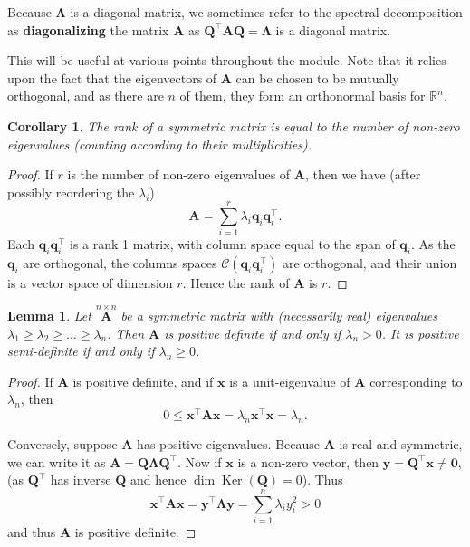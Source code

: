 \documentclass[]{book}
\newtheorem{lemma}{Lemma}[chapter]
\newtheorem{corollary}{Corollary}[chapter]
\theoremstyle{definition}
\theoremstyle{definition}
\theoremstyle{definition}
\theoremstyle{remark}
\begin{document}
Because \(\boldsymbol \Lambda\) is a diagonal matrix, we sometimes refer to the spectral decomposition as \textbf{diagonalizing} the matrix \(\boldsymbol A\) as \(\boldsymbol Q^\top\boldsymbol A\boldsymbol Q=\boldsymbol \Lambda\) is a diagonal matrix.

This will be useful at various points throughout the module. Note that it relies upon the fact that the eigenvectors of \(\boldsymbol A\) can be chosen to be mutually orthogonal, and as there are \(n\) of them, they form an orthonormal basis for \(\mathbb{R}^n\).

\begin{corollary}
\protect\hypertarget{cor:nonzeroeigen}{}{\label{cor:nonzeroeigen} }The rank of a symmetric matrix is equal to the number of non-zero eigenvalues (counting according to their multiplicities).
\end{corollary}
\begin{proof}
{}If \(r\) is the number of non-zero eigenvalues of \(\boldsymbol A\), then we have (after possibly reordering the \(\lambda_i\))
\[{\mathbf A}= \sum _{i=1}^{r} \lambda _i {\mathbf q}_i {\mathbf q}_i^\top. \]
Each \({\mathbf q}_i {\mathbf q}_i^\top\) is a rank 1 matrix, with column space equal to the span of \(\boldsymbol q_i\). As the \(\boldsymbol q_i\) are orthogonal, the columns spaces \(\mathcal{C}(\boldsymbol q_i \boldsymbol q_i^\top)\) are orthogonal, and their union
is a vector space of dimension \(r\). Hence the rank of \(\boldsymbol A\) is \(r\).
\end{proof}

\begin{lemma}
\protect\hypertarget{lem:eigposdef}{}{\label{lem:eigposdef} }Let \(\stackrel{n\times n}{\mathbf A}\) be a symmetric matrix
with (necessarily real) eigenvalues \(\lambda _1 \geq \lambda _2 \geq \dots \geq \lambda _n\). Then \(\mathbf A\) is \emph{positive definite}
if and only if \(\lambda _n >0\). It is positive semi-definite if and only if \(\lambda_n \geq 0\).
\end{lemma}
\begin{proof}
{}If \(\boldsymbol A\) is positive definite, and if \(\boldsymbol x\) is a unit-eigenvalue of \(\boldsymbol A\) corresponding to \(\lambda_n\), then
\[0\leq \boldsymbol x^\top \boldsymbol A\boldsymbol x= \lambda_n \boldsymbol x^\top \boldsymbol x= \lambda_n.\]

Conversely, suppose \(\boldsymbol A\) has positive eigenvalues. Because \(\boldsymbol A\) is real and symmetric, we can write it as \(\boldsymbol A=\boldsymbol Q{\mathbf\Lambda} \boldsymbol Q^\top\). Now if \(\boldsymbol x\) is a non-zero vector, then \(\boldsymbol y= \boldsymbol Q^\top \boldsymbol x\not= \boldsymbol 0\), (as \(\boldsymbol Q^\top\) has inverse \(\boldsymbol Q\) and hence \(\dim \operatorname{Ker}(\boldsymbol Q)=0\)). Thus
\[\boldsymbol x^\top \boldsymbol A\boldsymbol x= \boldsymbol y^\top {\mathbf\Lambda}\boldsymbol y= \sum_{i=1}^n \lambda_i y_i^2 >0\] and thus \(\boldsymbol A\) is positive definite.
\end{proof}
\end{document}
